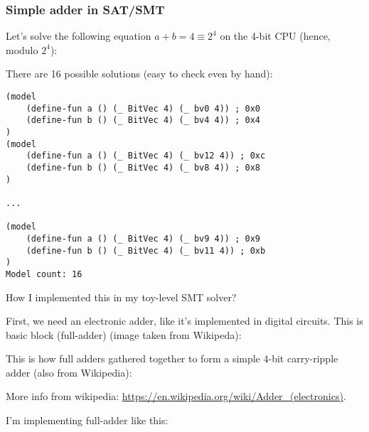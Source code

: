\subsubsection{Simple adder in SAT/SMT}

Let's solve the following equation $a+b=4 \equiv 2^4$ on the 4-bit CPU (hence, modulo $2^4$):



There are 16 possible solutions (easy to check even by hand):

\begin{lstlisting}
(model
	(define-fun a () (_ BitVec 4) (_ bv0 4)) ; 0x0
	(define-fun b () (_ BitVec 4) (_ bv4 4)) ; 0x4
)
(model
	(define-fun a () (_ BitVec 4) (_ bv12 4)) ; 0xc
	(define-fun b () (_ BitVec 4) (_ bv8 4)) ; 0x8
)

...

(model
	(define-fun a () (_ BitVec 4) (_ bv9 4)) ; 0x9
	(define-fun b () (_ BitVec 4) (_ bv11 4)) ; 0xb
)
Model count: 16
\end{lstlisting}

How I implemented this in my toy-level SMT solver?

First, we need an electronic adder, like it's implemented in digital circuits.
This is basic block (full-adder) (image taken from Wikipeda):

\begin{figure}[H]
\centering
{}
\end{figure}

This is how full adders gathered together to form a simple 4-bit carry-ripple adder (also from Wikipedia):

\begin{figure}[H]
\centering
{}
\end{figure}

More info from wikipedia: \url{https://en.wikipedia.org/wiki/Adder_(electronics)}.

I'm implementing full-adder like this:

